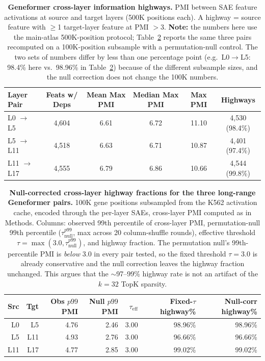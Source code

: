 \documentclass[11pt]{article}
\begin{document}
\begin{table}[H]
\centering
\caption{\textbf{Geneformer cross-layer information highways.} PMI between SAE feature activations at source and target layers (500K positions each). A highway = source feature with $\geq$1 target-layer feature at PMI $> 3$. \textbf{Note:} the numbers here use the main-atlas 500K-position protocol; Table~\ref{tab:highways_null} reports the same three pairs recomputed on a 100K-position subsample with a permutation-null control. The two sets of numbers differ by less than one percentage point (e.g.\ L0$\to$L5: 98.4\% here vs.\ 98.96\% in Table~\ref{tab:highways_null}) because of the different subsample sizes, and the null correction does not change the 100K numbers.}
\label{tab:highways}
\smallskip
\begin{tabular}{lccccc}
\toprule
Layer Pair & Feats w/ Deps & Mean Max PMI & Median Max PMI & Max PMI & Highways \\
\midrule
L0 $\to$ L5   & 4,604 & 6.61 & 6.72 & 11.10 & 4,530 (98.4\%) \\
L5 $\to$ L11  & 4,518 & 6.63 & 6.71 & 10.87 & 4,401 (97.4\%) \\
L11 $\to$ L17 & 4,555 & 6.79 & 6.86 & 10.66 & 4,544 (99.8\%) \\
\bottomrule
\end{tabular}
\end{table}

\begin{table}[H]
\centering
\caption{\textbf{Null-corrected cross-layer highway fractions for the three long-range Geneformer pairs.} 100K gene positions subsampled from the K562 activation cache, encoded through the per-layer SAEs, cross-layer PMI computed as in Methods. Columns: observed 99th percentile of cross-layer PMI, permutation-null 99th percentile ($\tau_{\text{null}}^{p99}$, max across 20 column-shuffle rounds), effective threshold $\tau = \max(3.0, \tau_{\text{null}}^{p99})$, and highway fraction. The permutation null's 99th-percentile PMI is \emph{below} 3.0 in every pair tested, so the fixed threshold $\tau{=}3.0$ is already conservative and the null correction leaves the highway fraction unchanged. This argues that the $\sim$97--99\% highway rate is not an artifact of the $k{=}32$ TopK sparsity.}
\label{tab:highways_null}
\smallskip
\small
\begin{tabular}{rrrrrrr}
\toprule
Src & Tgt & Obs $p99$ PMI & Null $p99$ PMI & $\tau_\text{eff}$ & Fixed-$\tau$ highway\% & Null-corr highway\% \\
\midrule
L0  & L5  & 4.76 & 2.46 & 3.00 & 98.96\% & 98.96\% \\
L5  & L11 & 4.93 & 2.76 & 3.00 & 96.66\% & 96.66\% \\
L11 & L17 & 4.77 & 2.85 & 3.00 & 99.02\% & 99.02\% \\
\bottomrule
\end{tabular}
\end{table}
\end{document}

